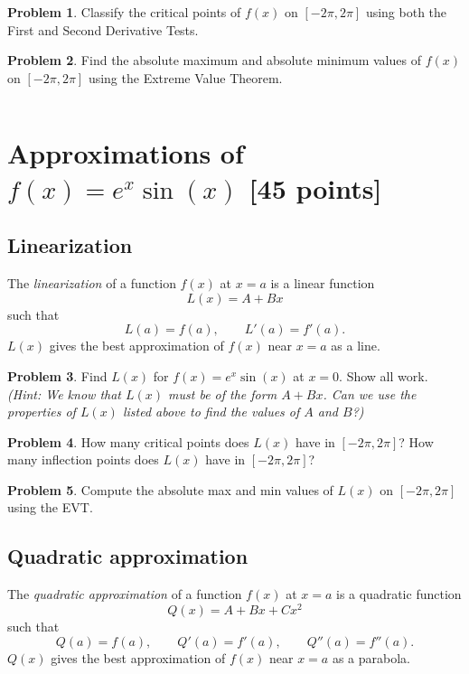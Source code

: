 \documentclass[11pt,reqno,final]{amsart}
\numberwithin{equation}{section}
\numberwithin{figure}{section}
\theoremstyle{definition} %
\newtheorem{problem}{Problem}
\begin{document}
\begin{problem}
        Classify the critical points of $f(x)$ on $[-2\pi, 2\pi]$ using both the First and Second Derivative Tests.
\end{problem}

\begin{problem}
        Find the absolute maximum and absolute minimum values of $f(x)$ on $[-2\pi, 2\pi]$ using the Extreme Value Theorem.
\end{problem}

$ $

\section{Approximations of $f(x) = e^x \sin(x)$ [45 points]}

\subsection{Linearization}
The \textit{linearization} of a function $f(x)$ at $x = a$ is a linear function
\[
        L(x) = A + Bx
\]
such that
\[
        L(a) = f(a), \qquad L'(a) = f'(a).
\]
$L(x)$ gives the best approximation of $f(x)$ near $x = a$ as a line.

\begin{problem}
        Find $L(x)$ for $f(x) = e^x \sin(x)$ at $x = 0$. Show all work.\\
        \textit{(Hint: We know that $L(x)$ must be of the form $A+ Bx$. Can we use the properties of $L(x)$ listed above to find the values of $A$ and $B$?)}
\end{problem}

\begin{problem}
        How many critical points does $L(x)$ have in $[-2\pi, 2\pi]$?
        How many inflection points does $L(x)$ have in $[-2\pi, 2\pi]$?        
\end{problem}

\begin{problem}
        Compute the absolute max and min values of $L(x)$ on $[-2\pi, 2\pi]$ using the EVT.
\end{problem}

\newpage

\subsection{Quadratic approximation}
The \textit{quadratic approximation} of a function $f(x)$ at $x = a$ is a quadratic function
\[
        Q(x) = A + Bx + Cx^2
\]
such that
\[
        Q(a) = f(a),
        \qquad
        Q'(a) = f'(a),
        \qquad
        Q''(a) = f''(a).
\]
$Q(x)$ gives the best approximation of $f(x)$ near $x = a$ as a parabola.
\end{document}
